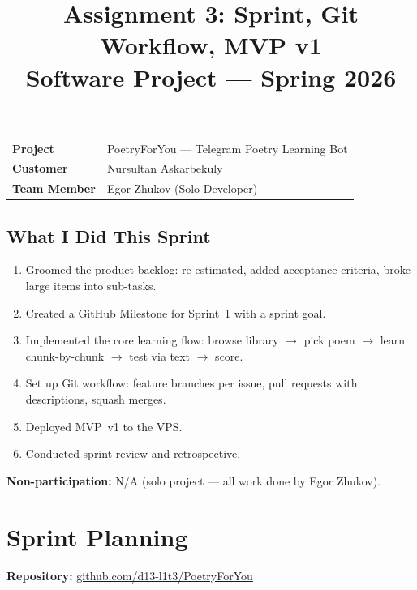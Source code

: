 \documentclass[11pt, a4paper]{article}
\title{\textbf{Assignment 3: Sprint, Git Workflow, MVP v1}\\[0.5em]
\large Software Project --- Spring 2026}
\author{}
\date{}
\begin{document}
\maketitle
\thispagestyle{empty}

\begin{center}
\begin{tabular}{ll}
\toprule
\textbf{Project} & PoetryForYou --- Telegram Poetry Learning Bot \\
\textbf{Customer} & Nursultan Askarbekuly \\
\textbf{Team Member} & Egor Zhukov (Solo Developer) \\
\bottomrule
\end{tabular}
\end{center}

\subsection*{What I Did This Sprint}
\begin{enumerate}
    \item Groomed the product backlog: re-estimated, added acceptance criteria, broke large items into sub-tasks.
    \item Created a GitHub Milestone for Sprint~1 with a sprint goal.
    \item Implemented the core learning flow: browse library $\rightarrow$ pick poem $\rightarrow$ learn chunk-by-chunk $\rightarrow$ test via text $\rightarrow$ score.
    \item Set up Git workflow: feature branches per issue, pull requests with descriptions, squash merges.
    \item Deployed MVP~v1 to the VPS.
    \item Conducted sprint review and retrospective.
\end{enumerate}

\textbf{Non-participation:} N/A (solo project --- all work done by Egor Zhukov).


\section{Sprint Planning}

\textbf{Repository:} \href{https://github.com/d13-l1t3/PoetryForYou}{github.com/d13-l1t3/PoetryForYou}
\end{document}
